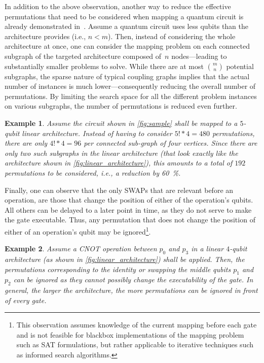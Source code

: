 \documentclass[10pt,conference]{IEEEtran}
\newtheorem{example}{Example}
\begin{document}
In addition to the above observation, another way to reduce the effective permutations that need to be considered when mapping a quantum circuit is already demonstrated in~\cite{willeMappingQuantumCircuits2019}.
Assume a quantum circuit uses less qubits than the architecture provides (i.e., $n < m$). 
Then, instead of considering the whole architecture at once, one can consider the mapping problem on each connected subgraph  of the targeted architecture composed of~$n$ nodes---leading to substantially smaller problems to solve. While there are at most $\binom{m}{n}$ potential subgraphs, the sparse nature of typical coupling graphs implies that the actual number of instances is much lower---consequently reducing the overall number of permutations. 
By limiting the search space for all the different problem instances on various subgraphs, the number of permutations is reduced even further.

\begin{example}\label{ex:subset-reduction}
	Assume the circuit shown in \autoref{fig:sample} shall be mapped to a $5$-qubit linear architecture. Instead of having to consider $5!*4 = 480$ permutations, there are only $4!*4 = 96$ per connected sub-graph of four vertices. Since there are only two such subgraphs in the linear architecture (that look exactly like the architecture shown in \autoref{fig:linear_architecture}), this amounts to a total of $192$ permutations to be considered, i.e., a reduction by \SI{60}{\percent}.
\end{example}

Finally, one can observe that the only SWAPs that are relevant before an operation, are those that change the position of either of the operation's qubits. All others can be delayed to a later point in time, as they do not serve to make the gate executable. Thus, any permutation that does not change the position of either of an operation's qubit may be ignored\footnote{ 
This observation assumes knowledge of the current mapping before each gate and is not feasible for blackbox implementations of the mapping problem such as SAT formulations, but rather applicable to iterative techniques such as informed search algorithms.}. 

\begin{example}
	Assume a \textit{CNOT} operation between $p_0$ and $p_3$ in a linear $4$-qubit architecture (as shown in \autoref{fig:linear_architecture}) shall be applied. Then, the permutations corresponding to the identity or swapping the middle qubits $p_1$ and $p_2$ can be ignored as they cannot possibly change the executability of the gate. In general, the larger the architecture, the more permutations can be ignored in front of every gate.
\end{example}
\end{document}
